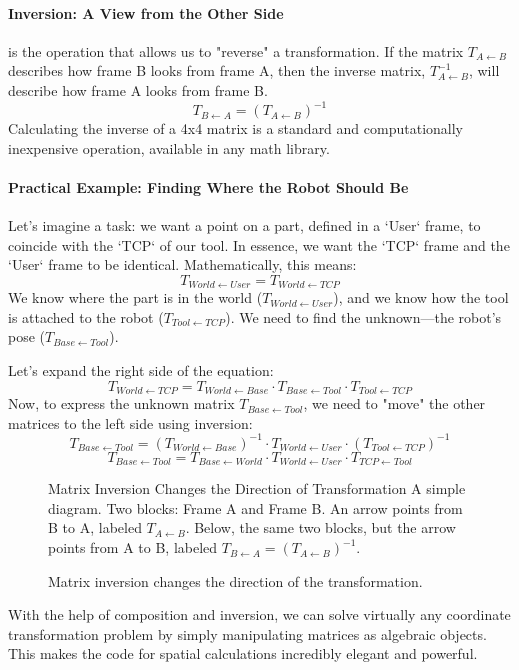 \paragraph{Inversion: A View from the Other Side}
 is the operation that allows us to "reverse" a transformation. If the matrix $T_{A \leftarrow B}$ describes how frame B looks from frame A, then the inverse matrix, $T_{A \leftarrow B}^{-1}$, will describe how frame A looks from frame B.
$$ T_{B \leftarrow A} = (T_{A \leftarrow B})^{-1} $$
Calculating the inverse of a 4x4 matrix is a standard and computationally inexpensive operation, available in any math library.

\paragraph{Practical Example: Finding Where the Robot Should Be}
Let's imagine a task: we want a point on a part, defined in a `User` frame, to coincide with the `TCP` of our tool. In essence, we want the `TCP` frame and the `User` frame to be identical. Mathematically, this means:
$$ T_{World \leftarrow User} = T_{World \leftarrow TCP} $$
We know where the part is in the world ($T_{World \leftarrow User}$), and we know how the tool is attached to the robot ($T_{Tool \leftarrow TCP}$). We need to find the unknown—the robot's pose ($T_{Base \leftarrow Tool}$).

Let's expand the right side of the equation:
$$ T_{World \leftarrow TCP} = T_{World \leftarrow Base} \cdot T_{Base \leftarrow Tool} \cdot T_{Tool \leftarrow TCP} $$
Now, to express the unknown matrix $T_{Base \leftarrow Tool}$, we need to "move" the other matrices to the left side using inversion:
$$ T_{Base \leftarrow Tool} = (T_{World \leftarrow Base})^{-1} \cdot T_{World \leftarrow User} \cdot (T_{Tool \leftarrow TCP})^{-1} $$
$$ T_{Base \leftarrow Tool} = T_{Base \leftarrow World} \cdot T_{World \leftarrow User} \cdot T_{TCP \leftarrow Tool} $$

\begin{figure}[h!]
    \centering
    \begin{infobox}{Matrix Inversion Changes the Direction of Transformation}
        A simple diagram. Two blocks: Frame A and Frame B. An arrow points from B to A, labeled $T_{A \leftarrow B}$. Below, the same two blocks, but the arrow points from A to B, labeled $T_{B \leftarrow A} = (T_{A \leftarrow B})^{-1}$.
    \end{infobox}
    \caption{Matrix inversion changes the direction of the transformation.}
    \label{fig:matrix_inversion}
\end{figure}

With the help of composition and inversion, we can solve virtually any coordinate transformation problem by simply manipulating matrices as algebraic objects. This makes the code for spatial calculations incredibly elegant and powerful.